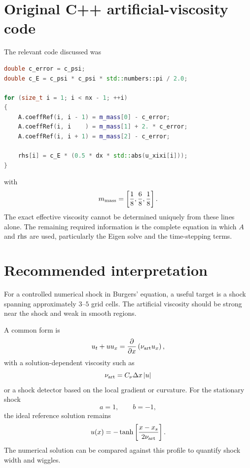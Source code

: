 \documentclass{mooiman_memo}
\begin{document}
\section{Original C++ artificial-viscosity code}
%
The relevant code discussed was
%
{{\small
\begin{lstlisting}[language=C++]
double c_error = c_psi;
double c_E = c_psi * c_psi * std::numbers::pi / 2.0;

for (size_t i = 1; i < nx - 1; ++i)
{
    A.coeffRef(i, i - 1) = m_mass[0] - c_error;
    A.coeffRef(i, i    ) = m_mass[1] + 2. * c_error;
    A.coeffRef(i, i + 1) = m_mass[2] - c_error;

    rhs[i] = c_E * (0.5 * dx * std::abs(u_xixi[i]));
}
\end{lstlisting}
}}
%
with
%
\begin{equation}
    m_{\rm mass}
    =
    \left[
        \frac18,\frac68,\frac18
    \right].
\end{equation}
%
The exact effective viscosity cannot be determined uniquely from
these lines alone. The remaining required information is the complete
equation in which $A$ and ${\rm rhs}$ are used, particularly the
Eigen solve and the time-stepping terms.
%
\section{Recommended interpretation}
%
For a controlled numerical shock in Burgers' equation, a useful target
is a shock spanning approximately $3$--$5$ grid cells. The artificial
viscosity should be strong near the shock and weak in smooth regions.

A common form is
%
\begin{equation}
    u_t+u u_x
    =
    \frac{\partial}{\partial x}
    \left(
        \nu_{\rm art}u_x
    \right),
\end{equation}
%
with a solution-dependent viscosity such as
%
\begin{equation}
    \nu_{\rm art}
    =
    C_\nu\Delta x\,|u|
\end{equation}
%
or a shock detector based on the local gradient or curvature.
%
For the stationary shock
%
\[
a=1,\qquad b=-1,
\]
%
the ideal reference solution remains
%
\begin{equation}
    u(x)=
    -\tanh\left[
        \frac{x-x_s}{2\nu_{\rm art}}
    \right].
\end{equation}
%
The numerical solution can be compared against this profile to
quantify shock width and wiggles.
%
\end{document}
